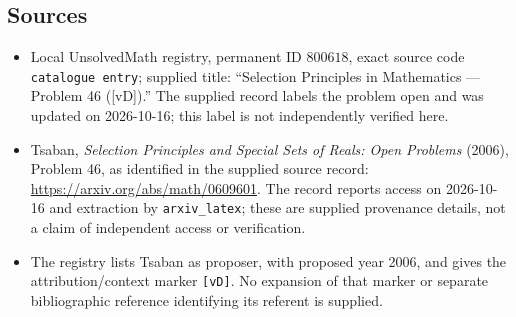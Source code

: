 \documentclass[11pt]{article}
\begin{document}
\subsection{Sources}
\begin{itemize}
\item Local UnsolvedMath registry, permanent ID \(800618\), exact source code \texttt{catalogue entry}; supplied title: ``Selection Principles in Mathematics --- Problem 46 ([vD]).'' The supplied record labels the problem open and was updated on 2026-10-16; this label is not independently verified here.
\item Tsaban, \emph{Selection Principles and Special Sets of Reals: Open Problems} (2006), Problem 46, as identified in the supplied source record: \url{https://arxiv.org/abs/math/0609601}. The record reports access on 2026-10-16 and extraction by \texttt{arxiv\_latex}; these are supplied provenance details, not a claim of independent access or verification.
\item The registry lists Tsaban as proposer, with proposed year 2006, and gives the attribution/context marker \texttt{[vD]}. No expansion of that marker or separate bibliographic reference identifying its referent is supplied.
\end{itemize}
\end{document}
